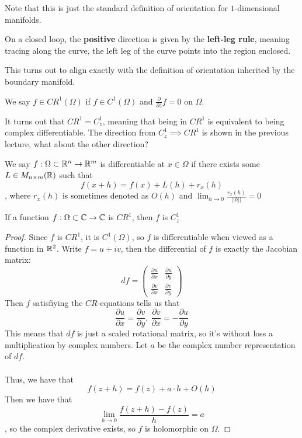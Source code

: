 \documentclass{article}
\begin{document}
Note that this is just the standard definition of orientation for $1$-dimensional manifolds.

On a closed loop, the \textbf{positive} direction is given by the \textbf{left-leg rule}, meaning tracing along the curve, the left leg of the curve points into the region enclosed.

This turns out to align exactly with the definition of orientation inherited by the boundary manifold.

\begin{definition}
We say $f \in CR^1(\Omega)$ if $f \in C^1(\Omega)$ and $\frac{\partial}{\partial \overline{z}} f = 0$ on $\Omega$.
\end{definition}

\begin{remark}
    It turns out that $CR^1 = C^1_z$, meaning that being in $CR^1$ is equivalent to being complex differentiable. The direction from $C^1_z \implies CR^1$ is shown in the previous lecture, what about the other direction?
\end{remark}

\begin{definition}
We say $f: \Omega \subset \mathbb{R}^n \to \mathbb{R}^m$ is differentiable at $x \in \Omega$ if there exists some $L \in M_{n \times m}(\mathbb{R})$ such that
\[f(x + h) = f(x) + L(h) + r_x(h)\]
, where $r_x(h)$ is sometimes denoted as $O(h)$ and $\lim_{h \to 0} \frac{r_x(h)}{||h||} = 0$
\end{definition}

\begin{proposition}
    If a function $f: \Omega \subset \mathbb{C} \to \mathbb{C}$ is $CR^1$, then $f$ is $C_z^1$
\end{proposition}

\begin{proof}
Since $f$ is $CR^1$, it is $C^1(\Omega)$, so $f$ is differentiable when viewed as a function in $\mathbb{R}^2$. Write $f = u + iv$, then the differential of $f$ is exactly the Jacobian matrix:
\[df = \begin{pmatrix} \frac{\partial u}{\partial x} & \frac{\partial u}{\partial y}\\
\frac{\partial v}{\partial x} & \frac{\partial v}{\partial y} \end{pmatrix}\]
Then $f$ satisfiying the $CR$-equations tells us that
\[\frac{\partial u}{\partial x} = \frac{\partial v}{\partial y},\ \frac{\partial v}{\partial x} = -\frac{\partial u}{\partial y}\]
This means that $df$ is just a scaled rotational matrix, so it's without loss a multiplication by complex numbers. Let $a$ be the complex number representation of $df$.\\\\
Thus, we have that
\[f(z + h) = f(z) + a \cdot h + O(h)\]
Then we have that
\[\lim_{h \to 0} \frac{f(z + h) - f(z)}{h} = a\]
, so the complex derivative exists, so $f$ is holomorphic on $\Omega$.
\end{proof}
\end{document}
